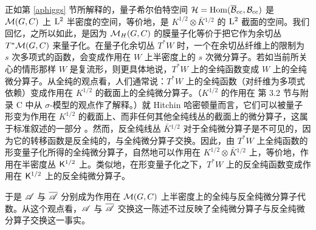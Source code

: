 正如第 \ref{aphiggs} 节所解释的，量子希尔伯特空间 ${\mathcal H}={\mathrm{Hom}}(\overline{{\mathcal B}}_{\mathrm{cc}},{\mathcal B}_{\mathrm{cc}})$ 是 ${\mathcal M}(G,C)$ 上 ${\mathrm L}^2$ 半密度的空间，等价地，是 $K^{1/2}\otimes \bar K{}^{1/2}$ 的 ${\mathrm L}^2$ 截面的空间。我们回忆，之所以如此，是因为 ${\mathcal M}_H(G,C)$ 的膜量子化等价于把它作为余切丛 $T^*{\mathcal M}(G,C)$ 来量子化。在量子化余切丛 $T^*W$ 时，一个在余切丛纤维上的限制为 $s$ 次多项式的函数，会变成作用在 $W$ 上半密度上的 $s$ 次微分算子。若如当前所关心的情形那样 $W$ 是复流形，则更具体地说，$T^*W$ 上的全纯函数变成 $W$ 上的全纯微分算子。从全纯的观点看，人们通常说：$T^*W$ 上的全纯函数（对纤维为多项式依赖）变成作用在 $K^{1/2}$ 的截面上的全纯微分算子。（$K^{1/2}$ 的作用在 \cite{GW} 第 3.2 节与附录 C 中从 $\sigma$-模型的观点作了解释。）就 Hitchin 哈密顿量而言，它们可以被量子形变为作用在 $K^{1/2}$ 的截面上、而非任何其他全纯线丛的截面上的微分算子，这属于标准叙述的一部分 \cite{H2,BD}。然而，反全纯线丛 $\bar K{}^{1/2}$ 对于全纯微分算子是不可见的，因为它的转移函数是反全纯的，与全纯微分算子交换。因此，由 $T^*W$ 上全纯函数的形变量子化所得的全纯微分算子，自然地可以作用在 $K^{1/2}\otimes \bar K{}^{1/2}$ 上，等价地，作用在半密度丛 ${\sf K}^{1/2}$ 上。类似地，在形变量子化之下，$T^*W$ 上的反全纯函数变成作用在 ${\sf K}^{1/2}$ 上的反全纯微分算子。




 

于是 ${\mathscr A}$ 与 $\overline{\mathscr A}$ 分别成为作用在 ${\mathcal M}(G,C)$ 上半密度上的全纯与反全纯微分算子代数。从这个观点看，${\mathscr A}$ 与 $\overline{\mathscr A}$ 交换这一陈述不过反映了全纯微分算子与反全纯微分算子交换这一事实。
